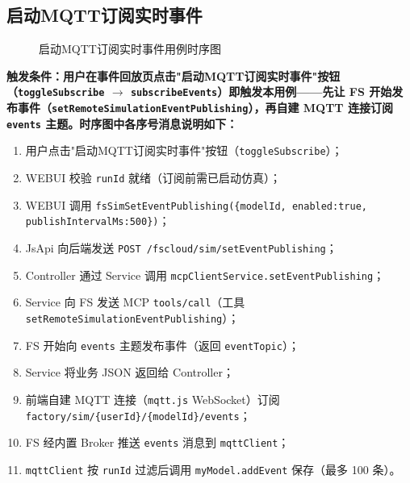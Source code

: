 \subsection{启动MQTT订阅实时事件}
\begin{figure}[!h]
	\centering
	\resizebox{1.0\linewidth}{!}{}
	\caption{启动MQTT订阅实时事件用例时序图}\label{fig:subscribeEvents}
\end{figure}
\bf{触发条件}：用户在事件回放页点击"启动MQTT订阅实时事件"按钮（\texttt{toggleSubscribe} $\rightarrow$ \texttt{subscribeEvents}）即触发本用例——先让 FS 开始发布事件（\texttt{setRemoteSimulationEventPublishing}），再自建 MQTT 连接订阅 \texttt{events} 主题。时序图中各序号消息说明如下：
\begin{enumerate}[label=\arabic*)]
	\item 用户点击"启动MQTT订阅实时事件"按钮（\texttt{toggleSubscribe}）；
	\item WEBUI 校验 \texttt{runId} 就绪（订阅前需已启动仿真）；
	\item WEBUI 调用 \texttt{fsSimSetEventPublishing(\{modelId, enabled:true, publishIntervalMs:500\})}；
	\item JsApi 向后端发送 \texttt{POST /fscloud/sim/setEventPublishing}；
	\item Controller 通过 Service 调用 \texttt{mcpClientService.setEventPublishing}；
	\item Service 向 FS 发送 MCP \texttt{tools/call}（工具 \texttt{setRemoteSimulationEventPublishing}）；
	\item FS 开始向 \texttt{events} 主题发布事件（返回 \texttt{eventTopic}）；
	\item Service 将业务 JSON 返回给 Controller；
	\item 前端自建 MQTT 连接（\texttt{mqtt.js} WebSocket）订阅 \texttt{factory/sim/\{userId\}/\{modelId\}/events}；
	\item FS 经内置 Broker 推送 \texttt{events} 消息到 \texttt{mqttClient}；
	\item \texttt{mqttClient} 按 \texttt{runId} 过滤后调用 \texttt{myModel.addEvent} 保存（最多 100 条）。
\end{enumerate}
\newpage
